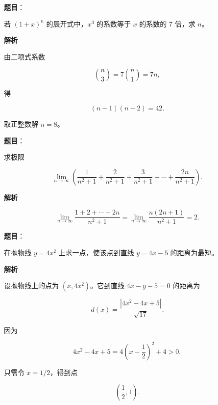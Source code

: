 \begin{answer}

\textbf{题目}：

若 $(1+x)^n$ 的展开式中，$x^3$ 的系数等于 $x$ 的系数的 7 倍，求 $n$。

\textbf{解析}

由二项式系数

\nopagebreak[4]
\[
\binom n3=7\binom n1=7n,
\]

得

\nopagebreak[4]
\[
(n-1)(n-2)=42.
\]

取正整数解 $n=8$。


\end{answer}
\begin{answer}

\textbf{题目}：

求极限

\nopagebreak[4]
\[
\lim_{n\to\infty}\left(
\frac1{n^2+1}+\frac2{n^2+1}+\frac3{n^2+1}
+\cdots+\frac{2n}{n^2+1}
\right).
\]

\textbf{解析}

\nopagebreak[4]
\[
\lim_{n\to\infty}
\frac{1+2+\cdots+2n}{n^2+1}
=\lim_{n\to\infty}\frac{n(2n+1)}{n^2+1}=2.
\]


\end{answer}
\begin{answer}

\textbf{题目}：

在抛物线 $y=4x^2$ 上求一点，使该点到直线 $y=4x-5$ 的距离为最短。

\textbf{解析}

设抛物线上的点为 $(x,4x^2)$。它到直线 $4x-y-5=0$ 的距离为

\nopagebreak[4]
\[
d(x)=\frac{|4x^2-4x+5|}{\sqrt{17}}.
\]

因为

\nopagebreak[4]
\[
4x^2-4x+5=4\left(x-\frac12\right)^2+4>0,
\]

只需令 $x=1/2$，得到点

\nopagebreak[4]
\[
\left(\frac12,1\right).
\]


\end{answer}
